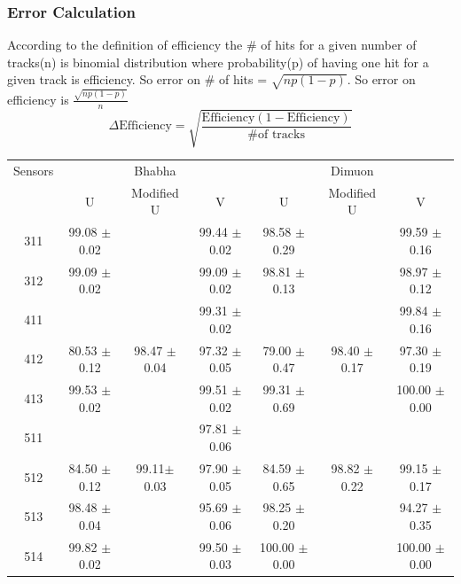 \documentclass[12pt]{article}
\begin{document}
	\subsubsection{Error Calculation}
	    According to the definition of efficiency the \# of hits for a given number of tracks(n) is binomial distribution where probability(p) of having one hit for a given track is efficiency. So error on \# of hits = $\sqrt{np(1-p)}$.
	    So error on efficiency is $\frac{\sqrt{np(1-p)}}{n}$
	    $$\Delta\text{Efficiency}=\sqrt{\frac{\text{Efficiency}(1-\text{Efficiency})}{\text{\# of tracks}}}$$
	\begin{table}
		
		\begin{tabular}{|c|c|c|c||| c|c|c|}
			\hline
			Sensors	&	\multicolumn{3}{|c|}{Bhabha } &\multicolumn{3}{|c|}{Dimuon }\\ \cline{2-7}
			& U &Modified U&V & U&Modified U& V\\ \cline{1-7}
			311 	&99.08  $\pm$ 0.02 &                      &99.44  $\pm$  0.02  &  98.58  $\pm$  0.29&                      &99.59    $\pm$ 0.16  \\
			312 	&99.09  $\pm$ 0.02 &                      &99.09  $\pm$  0.02  &  98.81  $\pm$  0.13&                      &98.97    $\pm$ 0.12  \\ \hline
			
			411 	&                  &                      &99.31  $\pm$  0.02  &                    &                      &99.84    $\pm$ 0.16  \\
			412 	&80.53  $\pm$ 0.12 & 98.47 $\pm$ 0.04     &97.32  $\pm$  0.05  &  79.00  $\pm$  0.47&  98.40 $\pm$ 0.17    &97.30    $\pm$ 0.19  \\
			413 	&99.53  $\pm$ 0.02 &                      &99.51  $\pm$  0.02  &  99.31  $\pm$  0.69&                      &100.00   $\pm$ 0.00  \\ \hline
			
			511 	&                  &                      &97.81  $\pm$  0.06  &                    &                      &                        \\
			512	&84.50  $\pm$ 0.12 & 99.11$\pm$ 0.03      &97.90  $\pm$  0.05  &  84.59  $\pm$  0.65&  98.82  $\pm$ 0.22   &99.15    $\pm$ 0.17  \\
			513	&98.48  $\pm$ 0.04 &                      &95.69  $\pm$  0.06  &  98.25  $\pm$  0.20&                      &94.27    $\pm$ 0.35  \\
			514	&99.82  $\pm$ 0.02 &                      &99.50  $\pm$  0.03  &  100.00 $\pm$  0.00&                      &100.00   $\pm$ 0.00  \\ \hline
			

\end{tabular}
\end{table}
\end{document}
